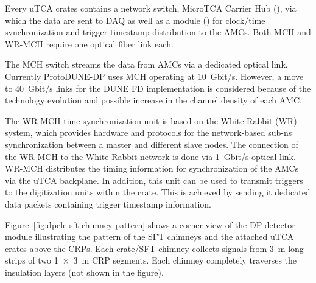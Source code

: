 Every uTCA crates contains a network switch, MicroTCA Carrier Hub (), via which the data are sent to DAQ as well as a module () for clock/time synchronization and trigger timestamp distribution to the AMCs. Both MCH and WR-MCH require one optical fiber link each. 

The MCH switch streams the data from AMCs via a dedicated optical link. Currently ProtoDUNE-DP uses MCH operating at \SI{10}{Gbit/s}. However, a move to \SI{40}{Gbit/s} links for the DUNE FD implementation is considered because of the technology evolution and possible increase in the channel density of each AMC.

The WR-MCH time synchronization unit is based on the White Rabbit (WR) system, which provides hardware and protocols for the network-based sub-ns synchronization between a master and different slave nodes. The connection of the WR-MCH to the White Rabbit network is done via \SI{1}{Gbit/s} optical link. WR-MCH distributes the timing information for synchronization of the AMCs via the uTCA backplane. In addition, this unit can be used to transmit triggers to the digitization units within the crate. This is achieved by sending it dedicated data packets containing trigger timestamp information. 

Figure~\ref{fig:dpele-sft-chimney-pattern} shows a corner view of the DP detector module illustrating the pattern of the SFT chimneys and the attached uTCA crates above the CRPs. Each crate/SFT chimney collects signals from \SI{3}{\meter} long strips of two \SI[product-units=power]{1x3}{\meter} CRP segments. Each chimney completely traverses the insulation layers (not shown in the figure). 


